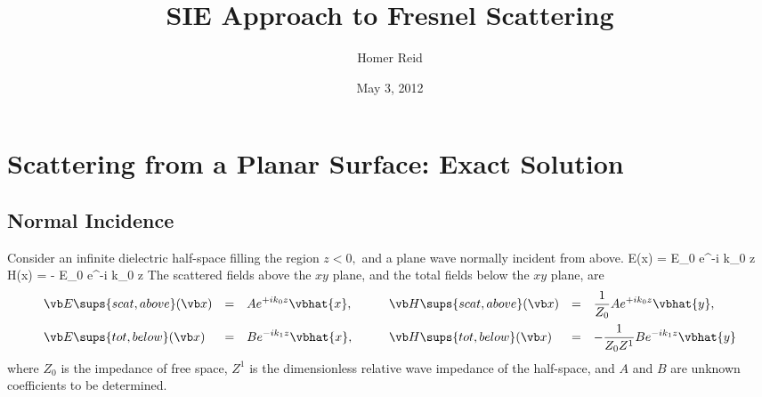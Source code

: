 \documentclass{article}
\title{SIE Approach to Fresnel Scattering}
\author {Homer Reid}
\date {May 3, 2012}
\begin{document}
\maketitle

\pagestyle{myheadings}


\tableofcontents 

\newpage
\section{Scattering from a Planar Surface: Exact Solution}

\subsection{Normal Incidence}

Consider an infinite dielectric half-space filling the region $z<0,$
and a plane wave normally incident from above.
{
  \vb E(\vb x) = E_0 e^{-i k_0 z}   \qquad
  \vb H(\vb x) = - E_0 e^{-i k_0 z} 
}
The scattered fields above the $xy$ plane, and the total fields below 
the $xy$ plane, are 
$$\begin{array}{lcllcl}
 \displaystyle{
  \vb E\sups{scat,above}(\vb x) 
              }
 &=
 &
 \displaystyle{
   A e^{+ik_0z}\vbhat{x}, 
              }
\qquad  
 &\displaystyle{
  \vb H\sups{scat,above}(\vb x) 
               }
 &= 
 &\displaystyle{
  \frac{1}{Z_0} A e^{+ik_0z}\vbhat{y}, 
               }
\\[10pt]
 \displaystyle{
  \vb E\sups{tot,below}(\vb x) 
              }
 &=
 &
 \displaystyle{
   B e^{-ik_1z}\vbhat{x}, 
              }
\qquad  
 &\displaystyle{
  \vb H\sups{tot,below}(\vb x) 
               }
 &= 
 &\displaystyle{
  -\frac{1}{Z_0 Z^1} B e^{-ik_1z}\vbhat{y}
               }
\end{array}$$
where $Z_0$ is the impedance of free space, 
$Z^1$ is the dimensionless relative wave impedance 
of the half-space, and $A$ and $B$ are unknown 
coefficients to be determined.
\end{document}
